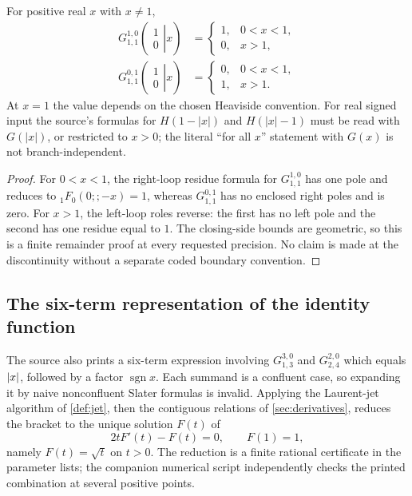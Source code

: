 \begin{theorem}\label{thm:step-g}
For positive real $x$ with $x\ne1$,
\begin{align}
G_{1,1}^{1,0}\!\left(\left.\begin{matrix}1\\0\end{matrix}\right|x\right)
 &=\begin{cases}1,&0<x<1,\\0,&x>1,\end{cases}
 \label{eq:step-in}\\
G_{1,1}^{0,1}\!\left(\left.\begin{matrix}1\\0\end{matrix}\right|x\right)
 &=\begin{cases}0,&0<x<1,\\1,&x>1.\end{cases}
 \label{eq:step-out}
\end{align}
At $x=1$ the value depends on the chosen Heaviside convention.  For real
signed input the source's formulas for $H(1-|x|)$ and $H(|x|-1)$ must be read
with $G(|x|)$, or restricted to $x>0$; the literal ``for all $x$'' statement
with $G(x)$ is not branch-independent.
\end{theorem}
\begin{proof}
For $0<x<1$, the right-loop residue formula for $G_{1,1}^{1,0}$ has one pole
and reduces to ${}_1F_0(0;;-x)=1$, whereas $G_{1,1}^{0,1}$ has no enclosed
right poles and is zero.  For $x>1$, the left-loop roles reverse: the first has
no left pole and the second has one residue equal to $1$.  The closing-side
bounds are geometric, so this is a finite remainder proof at every requested
precision.  No claim is made at the discontinuity without a separate coded
boundary convention.
\end{proof}

\subsection{The six-term representation of the identity function}

The source also prints a six-term expression involving
$G_{1,3}^{3,0}$ and $G_{2,4}^{2,0}$ which equals $\left|x\right|$, followed by a factor
$\operatorname{sgn}x$.  Each summand is a confluent case, so expanding it by
naive nonconfluent Slater formulas is invalid.  Applying the Laurent-jet
algorithm of \cref{def:jet}, then the contiguous relations of
\cref{sec:derivatives}, reduces the bracket to the unique solution $F(t)$ of
\[
 2tF'(t)-F(t)=0,\qquad F(1)=1,
\]
namely $F(t)=\sqrt t$ on $t>0$.  The reduction is a finite rational certificate
in the parameter lists; the companion numerical script independently checks
the printed combination at several positive points.

